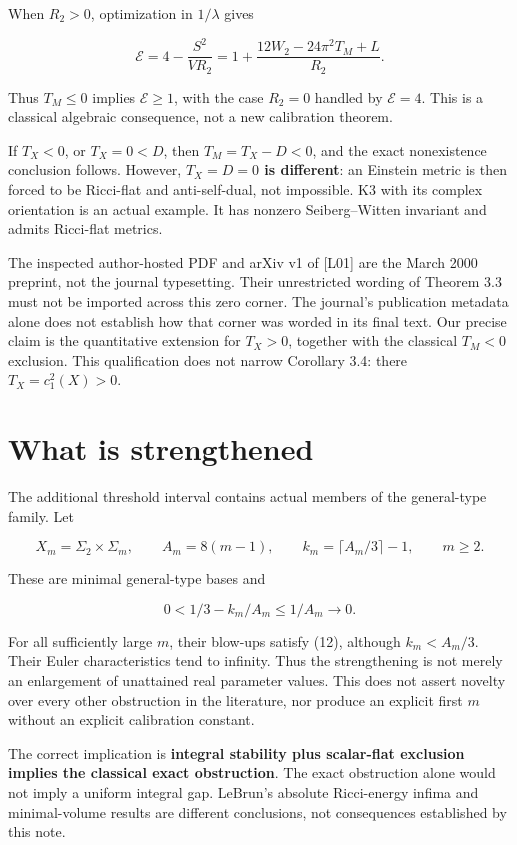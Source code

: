 \documentclass[
  10pt,
]{article}
\begin{document}
When \(R_2>0\), optimization in \(1/\lambda\) gives

\[
\mathcal E=4-\frac{S^2}{VR_2}
=1+\frac{12W_2-24\pi^2T_M+L}{R_2}.                     \tag{13}
\]

Thus \(T_M\le0\) implies \(\mathcal E\ge1\), with the case \(R_2=0\)
handled by \(\mathcal E=4\). This is a classical algebraic consequence,
not a new calibration theorem.

If \(T_X<0\), or \(T_X=0<D\), then \(T_M=T_X-D<0\), and the exact
nonexistence conclusion follows. However, \textbf{\(T_X=D=0\) is
different}: an Einstein metric is then forced to be Ricci-flat and
anti-self-dual, not impossible. K3 with its complex orientation is an
actual example. It has nonzero Seiberg--Witten invariant and admits
Ricci-flat metrics.

The inspected author-hosted PDF and arXiv v1 of {[}L01{]} are the March
2000 preprint, not the journal typesetting. Their unrestricted wording
of Theorem 3.3 must not be imported across this zero corner. The
journal's publication metadata alone does not establish how that corner
was worded in its final text. Our precise claim is the quantitative
extension for \(T_X>0\), together with the classical \(T_M<0\)
exclusion. This qualification does not narrow Corollary 3.4: there
\(T_X=c_1^2(X)>0\).

\hypertarget{what-is-strengthened}{%
\section{What is strengthened}\label{what-is-strengthened}}

The additional threshold interval contains actual members of the
general-type family. Let

\[
X_m=\Sigma_2\times\Sigma_m,\qquad A_m=8(m-1),\qquad
k_m=\lceil A_m/3\rceil-1,\qquad m\ge2.
\]

These are minimal general-type bases and

\[
0<1/3-k_m/A_m\le1/A_m\longrightarrow0.
\]

For all sufficiently large \(m\), their blow-ups satisfy (12), although
\(k_m<A_m/3\). Their Euler characteristics tend to infinity. Thus the
strengthening is not merely an enlargement of unattained real parameter
values. This does not assert novelty over every other obstruction in the
literature, nor produce an explicit first \(m\) without an explicit
calibration constant.

The correct implication is \textbf{integral stability plus scalar-flat
exclusion implies the classical exact obstruction}. The exact
obstruction alone would not imply a uniform integral gap. LeBrun's
absolute Ricci-energy infima and minimal-volume results are different
conclusions, not consequences established by this note.
\end{document}
